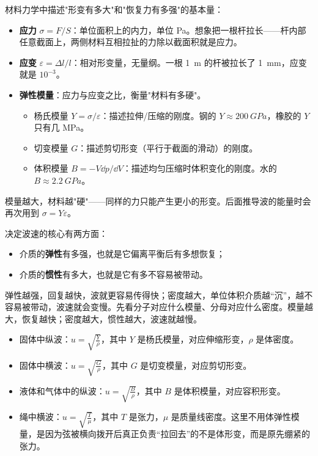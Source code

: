 \begin{definition}[应力、应变与弹性模量]\label{def:elastic-modulus}
材料力学中描述"形变有多大"和"恢复力有多强"的基本量：
\begin{itemize}
 \item \textbf{应力} \(\sigma=F/S\)：单位面积上的内力，单位 \unit{Pa}。想象把一根杆拉长——杆内部任意截面上，两侧材料互相拉扯的力除以截面积就是应力。
 \item \textbf{应变} \(\varepsilon=\Delta l/l\)：相对形变量，无量纲。一根 \SI{1}{m} 的杆被拉长了 \SI{1}{mm}，应变就是 \(10^{-3}\)。
 \item \textbf{弹性模量}：应力与应变之比，衡量"材料有多硬"。
 \begin{itemize}
 \item 杨氏模量 \(Y=\sigma/\varepsilon\)：描述拉伸/压缩的刚度。钢的 \(Y\approx\SI{200}{GPa}\)，橡胶的 \(Y\) 只有几 MPa。
 \item 切变模量 \(G\)：描述剪切形变（平行于截面的滑动）的刚度。
 \item 体积模量 \(B=-V\dd p/\dd V\)：描述均匀压缩时体积变化的刚度。水的 \(B\approx\SI{2.2}{GPa}\)。
 \end{itemize}
\end{itemize}
模量越大，材料越"硬"——同样的力只能产生更小的形变。后面推导波的能量时会再次用到 \(\sigma=Y\varepsilon\)。
\end{definition}
决定波速的核心有两方面：
\begin{itemize}
 \item 介质的\textbf{弹性}有多强，也就是它偏离平衡后有多想恢复；
 \item 介质的\textbf{惯性}有多大，也就是它有多不容易被带动。
\end{itemize}
弹性越强，回复越快，波就更容易传得快；密度越大，单位体积介质越“沉”，越不容易被带动，波速就会变慢。先看分子对应什么模量、分母对应什么密度。模量越大，恢复越快；密度越大，惯性越大，波速就越慢。
\begin{itemize}
 \item 固体中纵波：\(u=\sqrt{\frac{Y}{\rho}}\)，其中 \(Y\) 是杨氏模量，对应伸缩形变，\(\rho\) 是体密度。
 \item 固体中横波：\(u=\sqrt{\frac{G}{\rho}}\)，其中 \(G\) 是切变模量，对应剪切形变。
 \item 液体和气体中的纵波：\(u=\sqrt{\frac{B}{\rho}}\)，其中 \(B\) 是体积模量，对应容积形变。
 \item 绳中横波：\(u=\sqrt{\frac{T}{\mu}}\)，其中 \(T\) 是张力，\(\mu\) 是质量线密度。这里不用体弹性模量，是因为弦被横向拨开后真正负责“拉回去”的不是体形变，而是原先绷紧的张力。
\end{itemize}
